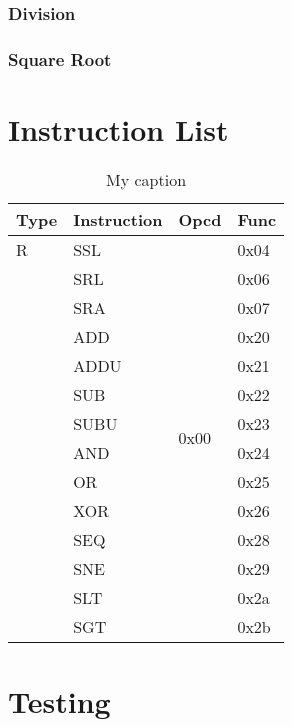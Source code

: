\subsection[Division]{Division}
\subsection[Square Root]{Square Root}

\chapter[Instruction List]{Instruction List}
\begin{table}[]
\centering
\caption{My caption}
\label{my-label}
\begin{tabular}{|l|l|l|l|}
\hline
Type & Instruction & Opcd                   & Func \\ \hline
R    & SSL         & \multirow{14}{*}{0x00} & 0x04 \\ \cline{1-2} \cline{4-4} 
     & SRL         &                        & 0x06 \\ \cline{1-2} \cline{4-4} 
     & SRA         &                        & 0x07 \\ \cline{1-2} \cline{4-4} 
     & ADD         &                        & 0x20 \\ \cline{1-2} \cline{4-4} 
     & ADDU        &                        & 0x21 \\ \cline{1-2} \cline{4-4} 
     & SUB         &                        & 0x22 \\ \cline{1-2} \cline{4-4} 
     & SUBU        &                        & 0x23 \\ \cline{1-2} \cline{4-4} 
     & AND         &                        & 0x24 \\ \cline{1-2} \cline{4-4} 
     & OR          &                        & 0x25 \\ \cline{1-2} \cline{4-4} 
     & XOR         &                        & 0x26 \\ \cline{1-2} \cline{4-4} 
     & SEQ         &                        & 0x28 \\ \cline{1-2} \cline{4-4} 
     & SNE         &                        & 0x29 \\ \cline{1-2} \cline{4-4} 
     & SLT         &                        & 0x2a \\ \cline{1-2} \cline{4-4} 
     & SGT         &                        & 0x2b \\ \hline
\end{tabular}
\end{table}

\chapter[Testing]{Testing}

